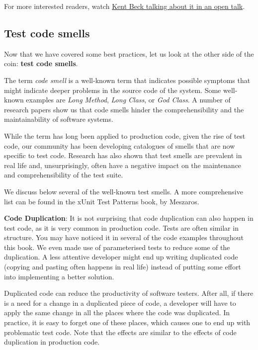 For more interested readers, watch
\href{https://www.youtube.com/watch?v=lXTwxMxNx-Y}{Kent Beck talking
about it in an open talk}.

\hypertarget{test-code-smells}{%
\subsection{Test code smells}\label{test-code-smells}}

Now that we have covered some best practices, let us look at the other
side of the coin: \textbf{test code smells}.

The term \emph{code smell} is a well-known term that indicates possible
symptoms that might indicate deeper problems in the source code of the
system. Some well-known examples are \emph{Long Method}, \emph{Long
Class}, or \emph{God Class}. A number of research papers show us that
code smells hinder the comprehensibility and the maintainability of
software systems.

While the term has long been applied to production code, given the rise
of test code, our community has been developing catalogues of smells
that are now specific to test code. Research has also shown that test
smells are prevalent in real life and, unsurprisingly, often have a
negative impact on the maintenance and comprehensibility of the test
suite.

We discuss below several of the well-known test smells. A more
comprehensive list can be found in the xUnit Test Patterns book, by
Meszaros.

\textbf{Code Duplication}: It is not surprising that code duplication
can also happen in test code, as it is very common in production code.
Tests are often similar in structure. You may have noticed it in several
of the code examples throughout this book. We even made use of
parameterised tests to reduce some of the duplication. A less attentive
developer might end up writing duplicated code (copying and pasting
often happens in real life) instead of putting some effort into
implementing a better solution.

Duplicated code can reduce the productivity of software testers. After
all, if there is a need for a change in a duplicated piece of code, a
developer will have to apply the same change in all the places where the
code was duplicated. In practice, it is easy to forget one of these
places, which causes one to end up with problematic test code. Note that
the effects are similar to the effects of code duplication in production
code.

